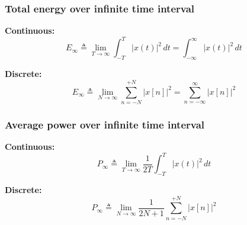     \subsubsection{Total energy over infinite time interval}
    \begin{definition}

        \textbf{Continuous:}
        \begin{equation}
            E_{\infty} \triangleq \lim_{T \to \infty} \int_{-T}^{T} |x(t)|^2 \, dt = \int_{-\infty}^{\infty} |x(t)|^2 \, dt
        \end{equation}

        \textbf{Discrete:}
        \begin{equation}
            E_{\infty} \triangleq \lim_{N \to \infty} \sum_{n=-N}^{+N} |x[n]|^2 = \sum_{n=-\infty}^{\infty} |x[n]|^2
        \end{equation}
    \end{definition}

    \subsubsection{Average power over infinite time interval}
    \begin{definition}

        \textbf{Continuous:}
        \begin{equation}
            P_{\infty} \triangleq \lim_{T \to \infty} \frac{1}{2T} \int_{-T}^{T} |x(t)|^2 \, dt
        \end{equation}

        \textbf{Discrete:}
        \begin{equation}
            P_{\infty} \triangleq \lim_{N \to \infty} \frac{1}{2N + 1} \sum_{n=-N}^{+N} |x[n]|^2
        \end{equation}
    \end{definition}